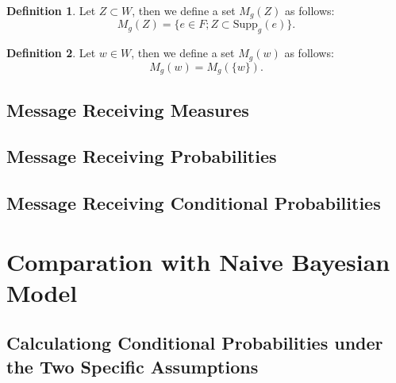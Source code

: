 \documentclass[11pt, a4note]{article}
\theoremstyle{definition}
\newtheorem{definition}{Definition}[section]
\begin{document}
\begin{definition}
Let $ Z \subset W $, then we define a set $ M_{g}(Z) $ as follows:
\begin{equation}
M_{g}(Z) = \{e \in F ; Z \subset \mathrm{Supp}_{g}(e)\}.
\end{equation}
\end{definition}

\begin{definition}
Let $ w \in W $, then we define a set $ M_{g}(w) $ as follows:
\begin{equation}
M_{g}(w) = M_{g}(\{w\}).
\end{equation}
\end{definition}

\subsection{Message Receiving Measures}

\subsection{Message Receiving Probabilities}

\subsection{Message Receiving Conditional Probabilities}

\section{Comparation with Naive Bayesian Model}

\subsection{Calculationg Conditional Probabilities under the Two Specific Assumptions}

\end{document}
